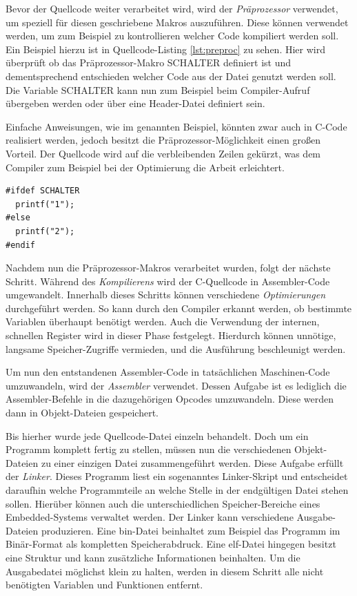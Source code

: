 \documentclass[
  a4paper,					%
  twoside,
  DIV=calc,     				%
  bibliography=totoc,
  cleardoublepage=empty,
  ngerman,     					%
  final       					%
]{scrbook}
\begin{document}
Bevor der Quellcode weiter verarbeitet wird, wird der \emph{Präprozessor} verwendet, um speziell für diesen geschriebene Makros auszuführen. Diese können verwendet werden, um zum Beispiel zu kontrollieren welcher Code kompiliert werden soll. Ein Beispiel hierzu ist in Quellcode-Listing \ref{lst:preproc} zu sehen. Hier wird überprüft ob das Präprozessor-Makro SCHALTER definiert ist und dementsprechend entschieden welcher Code aus der Datei genutzt werden soll. Die Variable SCHALTER kann nun zum Beispiel beim Compiler-Aufruf übergeben werden oder über eine Header-Datei definiert sein.

Einfache Anweisungen, wie im genannten Beispiel, könnten zwar auch in C-Code realisiert werden, jedoch besitzt die Präprozessor-Möglichkeit einen großen Vorteil. Der Quellcode wird auf die verbleibenden Zeilen gekürzt, was dem Compiler zum Beispiel bei der Optimierung die Arbeit erleichtert.

\begin{lstlisting}[frame=single, float, caption={Beispiel für Präprozessor-Anweisungen}, label={lst:preproc}]
#ifdef SCHALTER
  printf("1");
#else
  printf("2");
#endif
\end{lstlisting}

Nachdem nun die Präprozessor-Makros verarbeitet wurden, folgt der nächste Schritt. Während des \emph{Kompilierens} wird der C-Quellcode in Assembler-Code umgewandelt. Innerhalb dieses Schritts können verschiedene \emph{Optimierungen} durchgeführt werden. So kann durch den Compiler erkannt werden, ob bestimmte Variablen überhaupt benötigt werden. Auch die Verwendung der internen, schnellen Register wird in dieser Phase festgelegt. Hierdurch können unnötige, langsame Speicher-Zugriffe vermieden, und die Ausführung beschleunigt werden.

Um nun den entstandenen Assembler-Code in tatsächlichen Maschinen-Code umzuwandeln, wird der \emph{Assembler} verwendet. Dessen Aufgabe ist es lediglich die Assembler-Befehle in die dazugehörigen Opcodes umzuwandeln. Diese werden dann in Objekt-Dateien gespeichert.

Bis hierher wurde jede Quellcode-Datei einzeln behandelt. Doch um ein Programm komplett fertig zu stellen, müssen nun die verschiedenen Objekt-Dateien zu einer einzigen Datei zusammengeführt werden. Diese Aufgabe erfüllt der \emph{Linker}. Dieses Programm liest ein sogenanntes Linker-Skript und entscheidet daraufhin welche Programmteile an welche Stelle in der endgültigen Datei stehen sollen. Hierüber können auch die unterschiedlichen Speicher-Bereiche eines Embedded-Systems verwaltet werden. Der Linker kann verschiedene Ausgabe-Dateien produzieren. Eine bin-Datei beinhaltet zum Beispiel das Programm im Binär-Format als kompletten Speicherabdruck. Eine elf-Datei hingegen besitzt eine Struktur und kann zusätzliche Informationen beinhalten. Um die Ausgabedatei möglichst klein zu halten, werden in diesem Schritt alle nicht benötigten Variablen und Funktionen entfernt.
\end{document}
